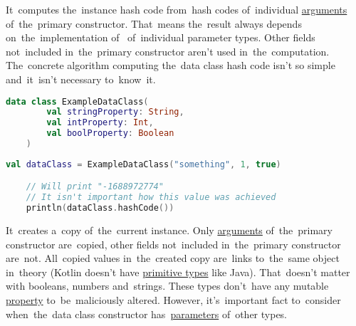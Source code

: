 \label{kotlindataclasshashcode}
It~computes the~instance hash code from~hash codes of~individual \hyperref[parameterargument]{arguments} of~the~primary constructor.
That~means the~result always depends on~the~implementation \mbox{of } of~individual parameter types.
Other fields not~included in~the~primary constructor aren't used in~the~computation.
The~concrete algorithm computing the~data class hash code isn't so simple and~it~isn't necessary to~know~it.

\example
\begin{lstlisting}[language=Kotlin, title={Data class}]
    data class ExampleDataClass(
        val stringProperty: String,
        val intProperty: Int,
        val boolProperty: Boolean
    )
\end{lstlisting}
\begin{lstlisting}[language=Kotlin, title={\itq{hashCode} behavior}]
    val dataClass = ExampleDataClass("something", 1, true)

    // Will print "-1688972774"
    // It isn't important how this value was achieved
    println(dataClass.hashCode())
\end{lstlisting}
\newline

\label{kotlindataclasscopy}
It~creates a~copy of~the~current instance.
Only \hyperref[parameterargument]{arguments} of~the~primary constructor are~copied, other fields not~included in~the~primary constructor are~not.
All~copied values in~the~created copy are~links to~the~same object in~theory (Kotlin doesn't have \hyperref[javaprimitivetypes]{primitive types} like Java).
That~doesn't matter with booleans, numbers and~strings.
These types don't~have any mutable \hyperref[variablefieldproperty]{property} to~be~maliciously altered.
However, it's~important fact to~consider when~the~data class constructor has~\hyperref[parameterargument]{parameters} of~other types.
\newline

